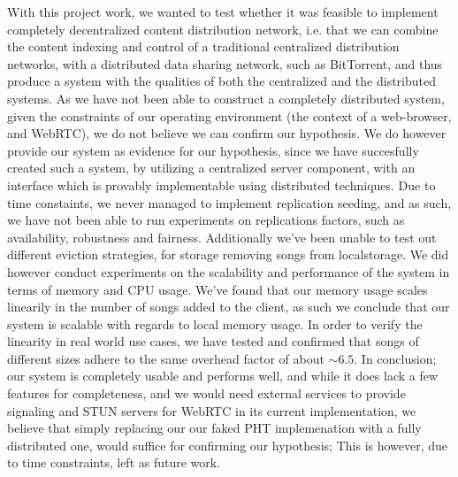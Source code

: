 With this project work, we wanted to test whether it was feasible to implement
completely decentralized content distribution network, i.e. that we can combine
the content indexing and control of a traditional centralized distribution networks, 
with a distributed data sharing network, such as BitTorrent, 
and thus produce a system
with the qualities of both the centralized and the distributed systems.
\newline\newline
As we have not been able to construct a completely distributed system,
given the constraints of our operating environment
(the context of a web-browser, and WebRTC),
we do not believe we can confirm our hypothesis.
We do however provide our system as evidence for our hypothesis, since we have
succesfully created such a system, by utilizing a centralized server component,
with an interface which is provably implementable using distributed techniques.
\newline\newline
Due to time constaints, 
we never managed to implement replication seeding, 
and as such,
we have not been able to run experiments on replications factors,
such as availability, robustness and fairness.
Additionally we've been unable to test out different eviction strategies,
for storage removing songs from localstorage.
\newline\newline
We did however conduct experiments on the scalability and performance of the 
system in terms of memory and CPU usage.
We've found that our memory usage scales linearily in the number of songs added
to the client, as such we conclude that our system is scalable with regards to
local memory usage. In order to verify the linearity in real world use cases,
we have tested and confirmed that songs of different sizes adhere to the same
overhead factor of about $\sim6.5$.
\newline\newline
In conclusion; our system is completely usable and performs well,
and while it does lack a few features for completeness,
and we would need external services to provide signaling and STUN servers for WebRTC
in its current implementation,
we believe that simply replacing our our faked \acs{PHT}
implemenation with a fully distributed one,
would suffice for confirming our hypothesis;
This is however, due to time constraints, left as future work.
